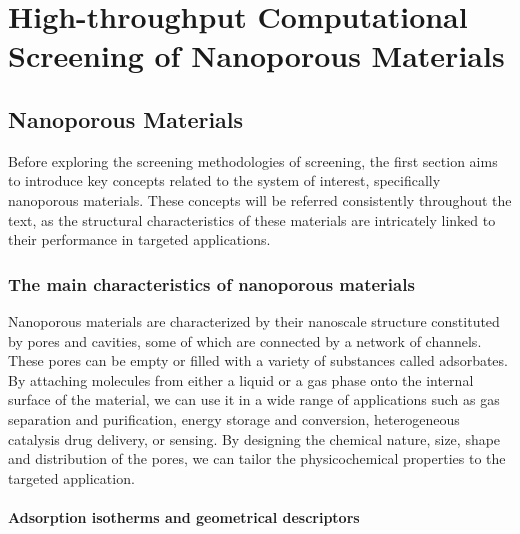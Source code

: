 \documentclass[main.tex]{subfiles}
\begin{document}
\chapter{High-throughput Computational Screening of Nanoporous Materials}
\vspace*{-1\baselineskip}

\section{Nanoporous Materials}

Before exploring the screening methodologies of screening, the first section aims to introduce key
concepts related to the system of interest, specifically nanoporous materials. These concepts will
be referred consistently throughout the text, as the structural characteristics of these materials
are intricately linked to their performance in targeted applications.

\subsection{The main characteristics of nanoporous materials}

Nanoporous materials are characterized by their nanoscale structure constituted by pores and cavities, some of which are connected by a network of channels. These pores can be empty or filled with a variety of substances called adsorbates. By attaching molecules from either a liquid or a gas phase onto the internal surface of the material, we can use it in a wide range of applications such as gas separation and purification,\autocite{Li_2009,Lagorsse_2007} energy storage and conversion,\autocite{Morris_2008,Qiu_2020} heterogeneous catalysis\autocite{Bell_2003,Singh_2019,Pascanu_2019} drug delivery,\autocite{Della_Rocca_2011,Bernini_2014} or sensing.\autocite{Breslin_1976} By designing the chemical nature, size, shape and distribution of the pores, we can tailor the physicochemical properties to the targeted application.\autocite{Yan_2020}

\subsubsection{Adsorption isotherms and geometrical descriptors}
\end{document}
